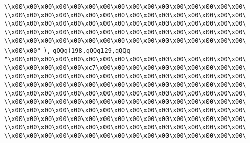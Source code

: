 \verb|\\x00\x00\x00\x00\x00\x00\x00\x00\x00\x00\x00\x00\x00\x00\x00\x00\|\newline
\verb|\\x00\x00\x00\x00\x00\x00\x00\x00\x00\x00\x00\x00\x00\x00\x00\x00\|\newline
\verb|\\x00\x00\x00\x00\x00\x00\x00\x00\x00\x00\x00\x00\x00\x00\x00\x00\|\newline
\verb|\\x00\x00\x00\x00\x00\x00\x00\x00\x00\x00\x00\x00\x00\x00\x00\x00\|\newline
\verb|\\x00\x00\x00\x00\x00\x00\x00\x00\x00\x00\x00\x00\x00\x00\x00\x00\|\newline
\verb|\\x00\x00"|\newline
\verb|),|\newline
\verb|qQQq(198,qQQq129,qQQq|\newline
\verb|"\x00\x00\x00\x00\x00\x00\x00\x00\x00\x00\x00\x00\x00\x00\x00\x00\|\newline
\verb|\\x00\x00\x00\x00\x00\xc7\x00\x00\x00\x00\x00\x00\x00\x00\x00\x00\|\newline
\verb|\\x00\x00\x00\x00\x00\x00\x00\x00\x00\x00\x00\x00\x00\x00\x00\x00\|\newline
\verb|\\x00\x00\x00\x00\x00\x00\x00\x00\x00\x00\x00\x00\x00\x00\x00\x00\|\newline
\verb|\\x00\x00\x00\x00\x00\x00\x00\x00\x00\x00\x00\x00\x00\x00\x00\x00\|\newline
\verb|\\x00\x00\x00\x00\x00\x00\x00\x00\x00\x00\x00\x00\x00\x00\x00\x00\|\newline
\verb|\\x00\x00\x00\x00\x00\x00\x00\x00\x00\x00\x00\x00\x00\x00\x00\x00\|\newline
\verb|\\x00\x00\x00\x00\x00\x00\x00\x00\x00\x00\x00\x00\x00\x00\x00\x00\|\newline
\verb|\\x00\x00\x00\x00\x00\x00\x00\x00\x00\x00\x00\x00\x00\x00\x00\x00\|\newline
\verb|\\x00\x00\x00\x00\x00\x00\x00\x00\x00\x00\x00\x00\x00\x00\x00\x00\|\newline
